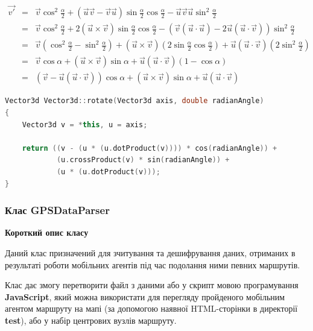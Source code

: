 \documentclass[simple,a4paper,14pt,ukrainian,utf8]{eskdtext}
\begin{document}
            \begin{displaymath}
                \begin{array}{lll}
                    \vec{v'} &=& \vec{v} \cos^2 \frac{\alpha}{2} + (\vec{u}\vec{v} - \vec{v}\vec{u}) \sin \frac{\alpha}{2} \cos \frac{\alpha}{2} - \vec{u}\vec{v}\vec{u} \sin^2 \frac{\alpha}{2} \\
                    &=& \vec{v} \cos^2 \frac{\alpha}{2} + 2 (\vec{u} \times \vec{v}) \sin \frac{\alpha}{2} \cos \frac{\alpha}{2} - (\vec{v} (\vec{u} \cdot \vec{u}) - 2 \vec{u} (\vec{u} \cdot \vec{v})) \sin^2 \frac{\alpha}{2} \\
                    &=& \vec{v} (\cos^2 \frac{\alpha}{2} - \sin^2 \frac{\alpha}{2}) + (\vec{u} \times \vec{v}) (2 \sin \frac{\alpha}{2} \cos \frac{\alpha}{2}) + \vec{u} (\vec{u} \cdot \vec{v}) (2 \sin^2 \frac{\alpha}{2}) \\
                    &=& \vec{v} \cos \alpha + (\vec{u} \times \vec{v}) \sin \alpha + \vec{u} (\vec{u} \cdot \vec{v}) (1 - \cos \alpha) \\
                    &=& (\vec{v} - \vec{u} (\vec{u} \cdot \vec{v})) \cos \alpha + (\vec{u} \times \vec{v}) \sin \alpha + \vec{u} (\vec{u} \cdot \vec{v})
                \end{array}
            \end{displaymath}
            
\begin{small}
\begin{lstlisting}[language=C++]
Vector3d Vector3d::rotate(Vector3d axis, double radianAngle)
{
    Vector3d v = *this, u = axis;

    return ((v - (u * (u.dotProduct(v)))) * cos(radianAngle)) +
            (u.crossProduct(v) * sin(radianAngle)) +
            (u * (u.dotProduct(v)));
}
\end{lstlisting}
\end{small}

        \subsubsection{Клас GPSDataParser}
        
        \textbf{Короткий опис класу}
        
        Даний клас призначений для зчитування та дешифрування даних, отриманих в результаті роботи мобільних агентів під час подолання ними певних маршрутів.
        
        Клас дає змогу перетворити файл з даними або у скрипт мовою програмування \textbf{JavaScript}, який можна використати для перегляду пройденого мобільним агентом маршруту на мапі (за допомогою наявної HTML-сторінки в директорії \textbf{test}), або у набір центрових вузлів маршруту.
        
\end{document}
